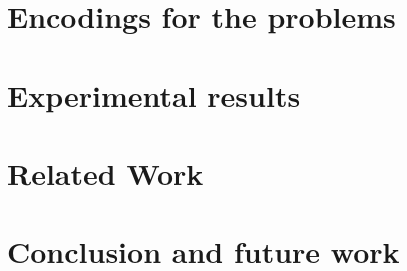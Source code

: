 \documentclass[smallcondensed]{svjour3}     %
\begin{document}
\section{Encodings for the problems}
\label{sec:encoding}


\section{Experimental results}
\label{sec:experiments}


\section{Related Work}
\label{sec:related}


\section{Conclusion and future work}
\label{sec:conclusion}



\end{document}
